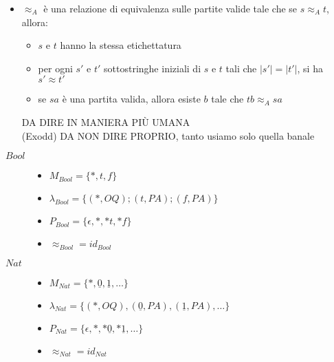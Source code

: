 \documentclass{beamer}
\begin{document}
\begin{frame}
	
	\begin{itemize}
	\item $\approx_A$ è una relazione di equivalenza sulle partite valide tale che se $s\approx_A t$, allora:
		\begin{itemize}
			\item $s$ e $t$ hanno la stessa etichettatura
			\item per ogni $s'$ e $t'$ sottostringhe iniziali di $s$ e $t$ tali che $|s'|=|t'|$, si ha $s' \approx t'$
			\item se $sa$ è una partita valida, allora esiste $b$ tale che $tb\approx_A sa$
		\end{itemize}
	DA DIRE IN MANIERA PIÙ UMANA\\
	(Exodd) DA NON DIRE PROPRIO, tanto usiamo solo quella banale
	\end{itemize}
	
	\begin{example}
		\begin{description}
			\item[$Bool$] \begin{itemize}
			              	\item $M_{Bool}=\{*,t,f\}$
			              	\item $\lambda_{Bool}= \{ (*,OQ) ; (t,PA) ; (f,PA) \}$
			              	\item $P_{Bool}= \{ \epsilon , * ,*t, *f \}$
			              	\item $\approx_{Bool} = id_{Bool}$
			              \end{itemize}

			\item[$Nat$] \begin{itemize}
			              	\item $M_{Nat}=\{ * , \underline{0} , \underline{1} , \dots \}$
			              	\item $\lambda_{Nat}= \{ (*,OQ) , (\underline{0},PA) , (\underline{1},PA) , \dots \}$
			              	\item $P_{Nat}= \{ \epsilon , * , *\underline{0} , *\underline{1} , \dots \}$
											\item $\approx_{Nat} = id_{Nat}$
			              \end{itemize}
		\end{description}

	\end{example}	
	
\end{frame}
\end{document}
